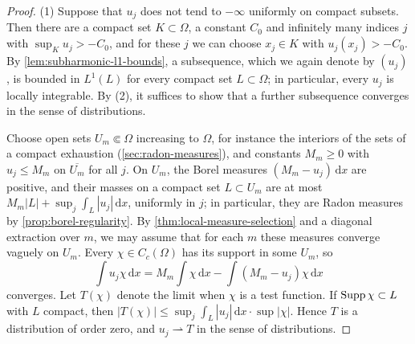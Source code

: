 \begin{proof}
(1) Suppose that $u_j$ does not tend to $-\infty$ uniformly on compact subsets. Then there are a compact set $K\subset\Omega$, a constant $C_0$ and infinitely many indices $j$ with $\sup_Ku_j>-C_0$, and for these $j$ we can choose $x_j\in K$ with $u_j(x_j)>-C_0$. By \cref{lem:subharmonic-l1-bounds}, a subsequence, which we again denote by $(u_j)$, is bounded in $L^1(L)$ for every compact set $L\subset\Omega$; in particular, every $u_j$ is locally integrable. By (2), it suffices to show that a further subsequence converges in the sense of distributions.

Choose open sets $U_m\Subset\Omega$ increasing to $\Omega$, for instance the interiors of the sets of a compact exhaustion (\cref{sec:radon-measures}), and constants $M_m\geq0$ with $u_j\leq M_m$ on $\overline{U_m}$ for all $j$. On $U_m$, the Borel measures $(M_m-u_j)\,\mathrm d x$ are positive, and their masses on a compact set $L\subset U_m$ are at most $M_m|L|+\sup_j\int_L|u_j|\,\mathrm dx$, uniformly in $j$; in particular, they are Radon measures by \cref{prop:borel-regularity}. By \cref{thm:local-measure-selection} and a diagonal extraction over $m$, we may assume that for each $m$ these measures converge vaguely on $U_m$. Every $\chi\in C_c(\Omega)$ has its support in some $U_m$, so
\[
 \int u_j\chi\,\mathrm d x=M_m\int\chi\,\mathrm d x-\int(M_m-u_j)\chi\,\mathrm d x
\]
converges. Let $T(\chi)$ denote the limit when $\chi$ is a test function. If $\operatorname{Supp}\chi\subset L$ with $L$ compact, then $|T(\chi)|\leq\sup_j\int_L|u_j|\,\mathrm d x\cdot\sup|\chi|$. Hence $T$ is a distribution of order zero, and $u_j\rightharpoonup T$ in the sense of distributions.
\end{proof}

